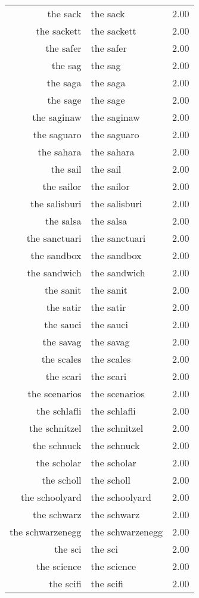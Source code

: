 \begin{table}[ht]
\begin{tabular}{rlr}
  the sack & the sack & 2.00 \\ 
  the sackett & the sackett & 2.00 \\ 
  the safer & the safer & 2.00 \\ 
  the sag & the sag & 2.00 \\ 
  the saga & the saga & 2.00 \\ 
  the sage & the sage & 2.00 \\ 
  the saginaw & the saginaw & 2.00 \\ 
  the saguaro & the saguaro & 2.00 \\ 
  the sahara & the sahara & 2.00 \\ 
  the sail & the sail & 2.00 \\ 
  the sailor & the sailor & 2.00 \\ 
  the salisburi & the salisburi & 2.00 \\ 
  the salsa & the salsa & 2.00 \\ 
  the sanctuari & the sanctuari & 2.00 \\ 
  the sandbox & the sandbox & 2.00 \\ 
  the sandwich & the sandwich & 2.00 \\ 
  the sanit & the sanit & 2.00 \\ 
  the satir & the satir & 2.00 \\ 
  the sauci & the sauci & 2.00 \\ 
  the savag & the savag & 2.00 \\ 
  the scales & the scales & 2.00 \\ 
  the scari & the scari & 2.00 \\ 
  the scenarios & the scenarios & 2.00 \\ 
  the schlafli & the schlafli & 2.00 \\ 
  the schnitzel & the schnitzel & 2.00 \\ 
  the schnuck & the schnuck & 2.00 \\ 
  the scholar & the scholar & 2.00 \\ 
  the scholl & the scholl & 2.00 \\ 
  the schoolyard & the schoolyard & 2.00 \\ 
  the schwarz & the schwarz & 2.00 \\ 
  the schwarzenegg & the schwarzenegg & 2.00 \\ 
  the sci & the sci & 2.00 \\ 
  the science & the science & 2.00 \\ 
  the scifi & the scifi & 2.00 \\ 

\end{tabular}
\end{table}
